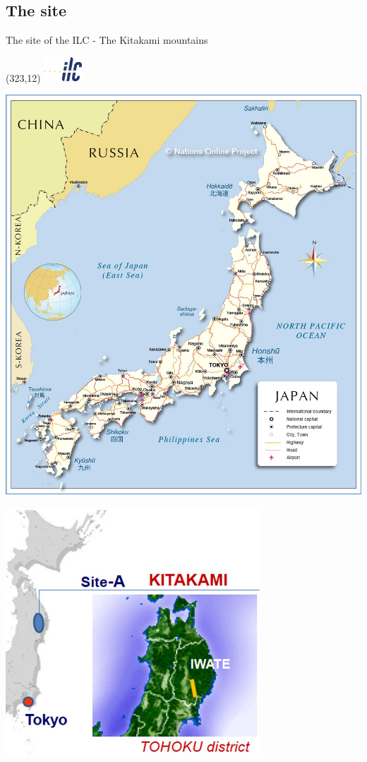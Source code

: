 \documentclass[xcolor={dvipsnames}]{beamer}
\newcommand{\ilclogo}{
  \setlength{\TPHorizModule}{1pt}
  \setlength{\TPVertModule}{1pt}
  \begin{textblock}{1}(323,12)
   \includegraphics[width=40pt,height=26pt]{figures/ILC.jpeg}
  \end{textblock}
}
\begin{document}
\subsection{The site}
\begin{frame}{The site of the ILC - The Kitakami mountains}
\ilclogo
\begin{center}
\begin{minipage}[t]{0.49\textwidth}
\centering
 \includegraphics[width=\textwidth]{figures/japan-map.jpg}
\end{minipage}
\begin{minipage}[t]{0.48\textwidth}
\centering
   \includegraphics[width=\textwidth]{figures/Kitakami_site.jpg}
\end{minipage}


\end{center}
\end{frame}
\end{document}
